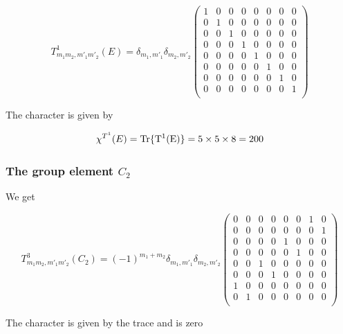 \begin{equation}\label{E3}
T^1_{m_1m_2,m'_1m'_2}(E)=\delta_{m_1,m'_1}\delta_{m_2,m'_2}
\left (
\begin{array}{ccccccccc}
1 & 0 & 0 & 0 & 0 & 0 & 0 & 0\\
0 & 1 & 0 & 0 & 0 & 0 & 0 & 0\\
0 & 0 & 1 & 0 & 0 & 0 & 0 & 0\\
0 & 0 & 0 & 1 & 0 & 0 & 0 & 0\\ 
0 & 0 & 0 & 0 & 1 & 0 & 0 & 0\\ 
0 & 0 & 0 & 0 & 0 & 1 & 0 & 0\\ 
0 & 0 & 0 & 0 & 0 & 0 & 1 & 0\\ 
0 & 0 & 0 & 0 & 0 & 0 & 0 & 1\\ 
\end{array} \right )
\end{equation}


The character is given by

\begin{equation}
\chi^{T^1}(E)=\rm Tr \{ T^1(E) \}=5\times5\times8=200
\end{equation}


\subsubsection{The group element $C_2$}

We get

\begin{equation}\label{C23}
T^3_{m_1m_2,m'_1m'_2}(C_2)=(-1)^{m_1+m_2}\delta_{m_1,m'_1}\delta_{m_2,m'_2}
\left (
\begin{array}{ccccccccc}
0 & 0 & 0 & 0 & 0 & 0 & 1 & 0\\
0 & 0 & 0 & 0 & 0 & 0 & 0 & 1\\
0 & 0 & 0 & 0 & 1 & 0 & 0 & 0\\
0 & 0 & 0 & 0 & 0 & 1 & 0 & 0\\ 
0 & 0 & 1 & 0 & 0 & 0 & 0 & 0\\ 
0 & 0 & 0 & 1 & 0 & 0 & 0 & 0\\ 
1 & 0 & 0 & 0 & 0 & 0 & 0 & 0\\ 
0 & 1 & 0 & 0 & 0 & 0 & 0 & 0\\ 
\end{array} \right )
\end{equation}

The character is given by the trace and is zero

